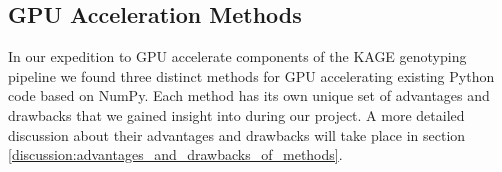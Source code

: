\subsection{GPU Acceleration Methods}
In our expedition to GPU accelerate components of the KAGE genotyping pipeline we found three distinct methods for GPU accelerating existing Python code based on NumPy.
Each method has its own unique set of advantages and drawbacks that we gained insight into during our project.
A more detailed discussion about their advantages and drawbacks will take place in section \ref{discussion:advantages_and_drawbacks_of_methods}.
